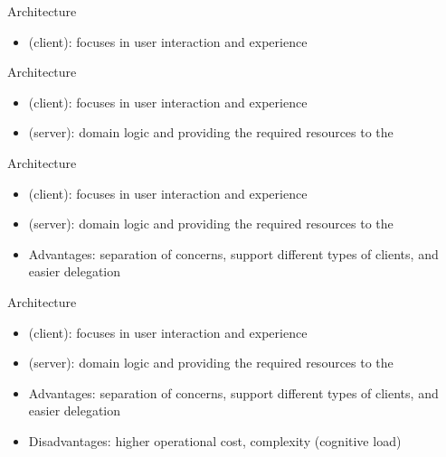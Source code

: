 \begin{frame}{Architecture}
    \begin{itemize}
        \item \mlblinkui (client): focuses in user interaction and experience
    \end{itemize}
\end{frame}

\begin{frame}{Architecture}
    \begin{itemize}
        \item \mlblinkui (client): focuses in user interaction and experience
        \item \mlblinkapi (server): domain logic and providing the required resources to the \mlblinkui
    \end{itemize}
\end{frame}

\begin{frame}{Architecture}
    \begin{itemize}
        \item \mlblinkui (client): focuses in user interaction and experience
        \item \mlblinkapi (server): domain logic and providing the required resources to the \mlblinkui
        \item Advantages: separation of concerns, support different types of clients, and easier delegation
    \end{itemize}
\end{frame}

\begin{frame}{Architecture}
    \begin{itemize}
        \item \mlblinkui (client): focuses in user interaction and experience
        \item \mlblinkapi (server): domain logic and providing the required resources to the \mlblinkui
        \item Advantages: separation of concerns, support different types of clients, and easier delegation
        \item Disadvantages: higher operational cost, complexity (cognitive load)
    \end{itemize}
\end{frame}


